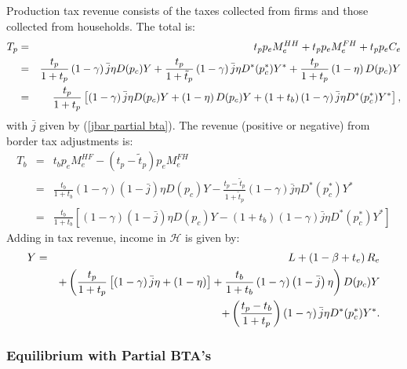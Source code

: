 \documentclass[notitlepage,12pt]{article}
\begin{document}
Production tax revenue consists of the taxes collected from firms and those
collected from households. The total is:%
\begin{eqnarray*}
T_{p} &=&t_{p}p_{e}M_{e}^{HH}+t_{p}p_{e}M_{e}^{FH}+t_{p}p_{e}C_{e} \\
&=&\frac{t_{p}}{1+t_{p}}\left( 1-\gamma \right) \bar{j}\eta D(p_{c})Y+\frac{%
t_{p}}{1+\tilde{t}_{p}}\left( 1-\gamma \right) \bar{j}\eta D^{\ast
}(p_{c}^{\ast })Y^{\ast }+\frac{t_{p}}{1+t_{p}}\left( 1-\eta \right)
D(p_{c})Y \\
&=&\frac{t_{p}}{1+t_{p}}\left[ \left( 1-\gamma \right) \bar{j}\eta
D(p_{c})Y+\left( 1-\eta \right) D(p_{c})Y+\left( 1+t_{b}\right) \left(
1-\gamma \right) \bar{j}\eta D^{\ast }(p_{c}^{\ast })Y^{\ast }\right] ,
\end{eqnarray*}%
with $\bar{j}$ given by (\ref{jbar partial bta}). The revenue (positive or
negative) from border tax adjustments is:%
\begin{eqnarray*}
T_{b} &=&t_{b}p_{e}M_{e}^{HF}-\left( t_{p}-\tilde{t}_{p}\right)
p_{e}M_{e}^{FH} \\
&=&\frac{t_{b}}{1+t_{b}}\left( 1-\gamma \right) \left( 1-\bar{j}\right) \eta
D(p_{c})Y-\frac{t_{p}-\tilde{t}_{p}}{1+\tilde{t}_{p}}\left( 1-\gamma \right) 
\bar{j}\eta D^{\ast }(p_{c}^{\ast })Y^{\ast } \\
&=&\frac{t_{b}}{1+t_{b}}\left[ \left( 1-\gamma \right) \left( 1-\bar{j}%
\right) \eta D(p_{c})Y-\left( 1+t_{b}\right) \left( 1-\gamma \right) \bar{j}%
\eta D^{\ast }(p_{c}^{\ast })Y^{\ast }\right]
\end{eqnarray*}%
Adding in tax revenue, income in $\mathcal{H}$ is given by:%
\begin{eqnarray}
Y &=&L+\left( 1-\beta +t_{e}\right) R_{e}  \notag \\
&&+\left( \frac{t_{p}}{1+t_{p}}\left[ \left( 1-\gamma \right) \bar{j}\eta
+\left( 1-\eta \right) \right] +\frac{t_{b}}{1+t_{b}}\left( 1-\gamma \right)
\left( 1-\bar{j}\right) \eta \right) D(p_{c})Y  \notag \\
&&+\left( \frac{t_{p}-t_{b}}{1+t_{p}}\right) \left( 1-\gamma \right) \bar{j}%
\eta D^{\ast }(p_{c}^{\ast })Y^{\ast }.  \label{Y home partial bta}
\end{eqnarray}

\subsubsection{Equilibrium with Partial BTA's}
\end{document}
